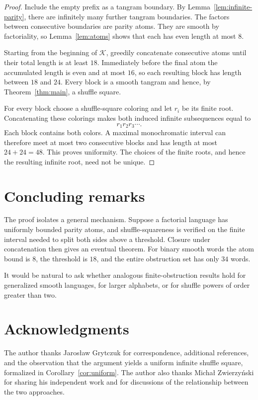 \documentclass[11pt]{article}
\theoremstyle{definition}
\theoremstyle{remark}
\newcommand{\K}{\mathcal K}
\begin{document}
\begin{proof}
Include the empty prefix as a tangram boundary.  By
Lemma~\ref{lem:infinite-parity}, there are infinitely many further
tangram boundaries.  The factors between consecutive boundaries are
parity atoms.  They are smooth by factoriality, so
Lemma~\ref{lem:atoms} shows that each has even length at most $8$.

Starting from the beginning of $\K$, greedily concatenate consecutive
atoms until their total length is at least $18$.  Immediately before
the final atom the accumulated length is even and at most $16$, so each
resulting block has length between $18$ and $24$.  Every block is a
smooth tangram and hence, by Theorem~\ref{thm:main}, a shuffle square.

For every block choose a shuffle-square coloring and let $r_i$ be its
finite root.  Concatenating these colorings makes both induced infinite
subsequences equal to
\[
 r_1r_2r_3\cdots.
\]
Each block contains both colors.  A maximal monochromatic interval can
therefore meet at most two consecutive blocks and has length at most
$24+24=48$.  This proves uniformity.  The choices of the finite roots,
and hence the resulting infinite root, need not be unique.
\end{proof}

\section{Concluding remarks}

The proof isolates a general mechanism.  Suppose a factorial language
has uniformly bounded parity atoms, and shuffle-squareness is verified
on the finite interval needed to split both sides above a threshold.
Closure under concatenation then gives an eventual theorem.  For binary
smooth words the atom bound is $8$, the threshold is $18$, and the
entire obstruction set has only $34$ words.

It would be natural to ask whether analogous finite-obstruction results
hold for generalized smooth languages, for larger alphabets, or for
shuffle powers of order greater than two.

\section*{Acknowledgments}

The author thanks Jaros\l{}aw Grytczuk for correspondence, additional
references, and the observation that the argument yields a uniform
infinite shuffle square, formalized in Corollary~\ref{cor:uniform}.
The author also thanks Micha\l{} Zwierzy\'nski for sharing his independent
work and for discussions of the relationship between the two approaches.
\end{document}
